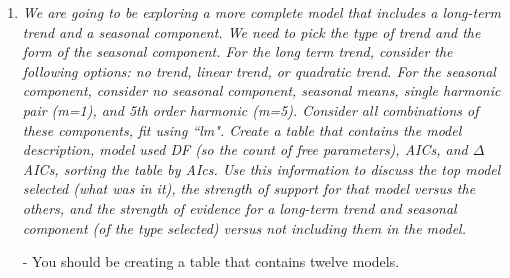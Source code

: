 \documentclass[11pt]{article}\usepackage[]{graphicx}\usepackage[]{color}
\begin{document}
\begin{enumerate}

\item%
{\it We are going to be exploring a more complete model that includes a long-term trend and a seasonal component. We need to pick the type of trend and the form of the seasonal component. For the long term trend, consider the following options: no trend, linear trend, or quadratic trend. For the seasonal component, consider no seasonal component, seasonal means, single harmonic pair (m=1), and 5th order harmonic (m=5). Consider all combinations of these components, fit using ``lm".  Create a table that contains the model description, model used DF (so the count of free parameters), AICs, and $\Delta$AICs, sorting the table by AIcs. Use this information to discuss the top model selected (what was in it), the strength of support for that model versus the others, and the strength of evidence for a long-term trend and seasonal component (of the type selected) versus not including them in the model. 

  - You should be creating a table that contains twelve models.}
  

\end{enumerate}
\end{document}
